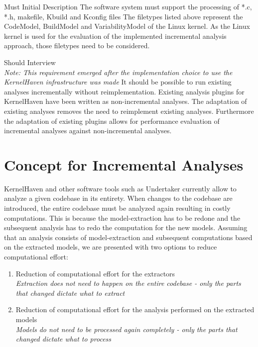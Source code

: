 \documentclass[a4paper]{article}
\begin{document}
\clearpage
\begin{req} 
\reqtable
    {Must}  {Initial Description}
	{The software system must support the processing of *.c, *.h, makefile, Kbuild and Kconfig files}
	{The filetypes listed above represent the CodeModel, BuildModel and VariabilityModel of the Linux kernel. As the Linux kernel is used for the evaluation of the implemented incremental analysis approach, those filetypes need to be considered.}
\end{req}


\begin{req} 
\reqtable
    {Should}  {Interview \\ \emph{Note: This requirement emerged after the implementation choice to use the KernelHaven infrastructure was made}}
	{It should be possible to run existing analyses incrementally without reimplementation.}
	{Existing analysis plugins for KernelHaven have been written as non-incremental analyses. The adaptation of existing analyses removes the need to reimplement existing analyses. Furthermore the adaptation of existing plugins allows for performance evaluation of incremental analyses against non-incremental analyses.}
\end{req}

\newpage

\section{Concept for Incremental Analyses}\label{concept}

KernelHaven and other software tools such as Undertaker\cite{Tartler:2011:FCC:1966445.1966451} currently allow to analyze a given codebase in its entirety. When changes to the codebase are introduced, the entire codebase must be analyzed again resulting in costly computations. This is because the model-extraction has to be redone and the subsequent analysis has to redo the computation for the new models. Assuming that an analysis consists of model-extraction and subsequent computations based on the extracted models, we are presented with two options to reduce computational effort:

\begin{enumerate}
	\item Reduction of computational effort for the extractors \\
	\emph{Extraction does not need to happen on the entire codebase - only the parts that changed dictate what to extract}
	\item Reduction of computational effort for the analysis performed on the extracted models \\
	\emph{Models do not need to be processed again completely - only the parts that changed dictate what to process}
\end{enumerate}
\end{document}
